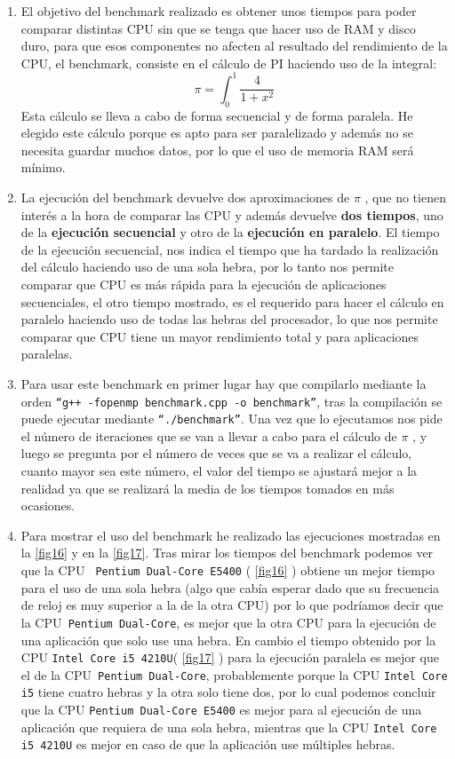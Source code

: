 \begin{enumerate}
  \item El objetivo del benchmark realizado es obtener unos tiempos para poder comparar distintas CPU sin que se tenga que hacer uso de RAM y disco duro, para que esos componentes no afecten al resultado del rendimiento de la CPU, el benchmark, consiste en el cálculo de PI haciendo uso de la integral: $$ \pi = \int_{0}^{1} \frac{4}{1+x^{2}} $$ Esta cálculo se lleva a cabo de forma secuencial y de forma paralela. He elegido este cálculo porque es apto para ser paralelizado y además no se necesita guardar muchos datos, por lo que el uso de memoria RAM será mínimo.
  
  \item La ejecución del benchmark devuelve dos aproximaciones de $\pi$ , que no tienen interés a la hora de comparar las CPU y además devuelve \textbf{dos tiempos}, uno de la \textbf{ejecución secuencial} y otro de la \textbf{ejecución en paralelo}. El tiempo de la ejecución secuencial, nos indica el tiempo que ha tardado la realización del cálculo haciendo uso de una sola hebra, por lo tanto nos permite comparar que CPU es más rápida para la ejecución de aplicaciones secuenciales, el otro tiempo mostrado, es el requerido para hacer el cálculo en paralelo haciendo uso de todas las hebras del procesador, lo que nos permite comparar que CPU tiene un mayor rendimiento total y para aplicaciones paralelas.
  
  \item Para usar este benchmark en primer lugar hay que compilarlo mediante la orden \texttt{``g++ -fopenmp benchmark.cpp -o benchmark''}, tras la compilación se puede ejecutar mediante \texttt{``./benchmark''}. Una vez que lo ejecutamos nos pide el número de iteraciones que se van a llevar a cabo para el cálculo de $\pi$ , y luego se pregunta por el número de veces que se va a realizar el cálculo, cuanto mayor sea este número, el valor del tiempo se ajustará mejor a la realidad ya que se realizará la media de los tiempos tomados en más ocasiones.
  
  \item Para mostrar el uso del benchmark he realizado las ejecuciones mostradas en la \cref{fig16} y en la \cref{fig17}. Tras mirar los tiempos del benchmark podemos ver que la CPU \texttt{ Pentium Dual-Core E5400} ( \cref{fig16} ) obtiene un mejor tiempo para el uso de una sola hebra (algo que cabía esperar dado que su frecuencia de reloj es muy superior a la de la otra CPU) por lo que podríamos decir que la CPU\texttt{ Pentium Dual-Core}, es mejor que la otra CPU para la ejecución de una aplicación que solo use una hebra. En cambio el tiempo obtenido por la CPU \texttt{Intel Core i5 4210U}( \cref{fig17} ) para la ejecución paralela es mejor que el de la CPU\texttt{ Pentium Dual-Core}, probablemente porque la CPU \texttt{Intel Core i5} tiene cuatro hebras y la otra solo tiene dos, por lo cual podemos concluir que la CPU \texttt{Pentium Dual-Core E5400} es mejor para al ejecución de una aplicación que requiera de una sola hebra, mientras que la CPU \texttt{Intel Core i5 4210U} es mejor en caso de que la aplicación use múltiples hebras.
\end{enumerate}

